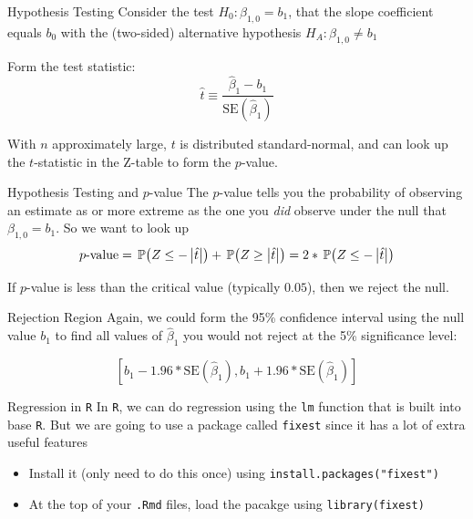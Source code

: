 \documentclass[aspectratio=169,t,11pt,table]{beamer}
\begin{document}
\begin{frame}{Hypothesis Testing}
  Consider the test $H_0: \beta_{1, 0} = b_1$, that the slope coefficient equals $b_0$ with the (two-sided) alternative hypothesis $H_A: \beta_{1, 0} \neq b_1$

  \bigskip
  Form the \alert{test statistic}:
  $$
    \hat{t} \equiv \frac{\hat{\beta}_1 - b_1}{\text{SE}(\hat{\beta}_1)}
  $$

  With $n$ approximately large, $t$ is distributed standard-normal, and can look up the $t$-statistic in the Z-table to form the \alert{$p$-value}.
\end{frame}

\begin{frame}{Hypothesis Testing and $p$-value}
  The $p$-value tells you the probability of observing an estimate as or more extreme as the one you \emph{did} observe under the null that $\beta_{1, 0} = b_1$. So we want to look up 
  $$
    p\text{-value} = \prob{Z \leq - \abs{\hat{t}}} + \prob{Z \geq \abs{\hat{t}}} = 2 * \prob{Z \leq - \abs{\hat{t}}} 
  $$

  \pause
  \bigskip
  If $p$-value is less than the critical value (typically $0.05$), then we reject the null.
\end{frame}

\begin{frame}{Rejection Region}
  Again, we could form the 95\% confidence interval using the null value $b_1$ to find all values of $\hat{\beta}_1$ you would not reject at the 5\% significance level:

  $$
    \left[
      b_1 - 1.96 * \text{SE}(\hat{\beta}_1),
      b_1 + 1.96 * \text{SE}(\hat{\beta}_1)
    \right]
  $$
\end{frame}

\begin{frame}{Regression in \texttt{R}}
  In \texttt{R}, we can do regression using the \texttt{lm} function that is built into base \texttt{R}. But we are going to use a package called \texttt{fixest} since it has a lot of extra useful features
  \begin{itemize}
    \item Install it (only need to do this once) using \texttt{install.packages("fixest")}
    
    \item At the top of your \texttt{.Rmd} files, load the pacakge using \texttt{library(fixest)}
  \end{itemize}
\end{frame}
\end{document}
